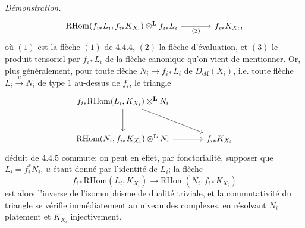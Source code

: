\documentclass[11pt]{article}
\newenvironment{prooftext}[1][Proof]{\par\noindent\emph{#1.}\ }{\par\medskip}
\providecommand{\RHom}{\mathrm{RHom}}
\providecommand{\Dctf}{D_{\mathrm{ctf}}}
\providecommand{\Dctf}{D_{\mathrm{ctf}}}
\providecommand{\RHom}{\mathrm{RHom}}
\providecommand{\RHom}{\mathrm R\mathcal{H}om}
\providecommand{\RHom}{\mathrm{RHom}}
\begin{document}
\begin{prooftext}[Démonstration]
\begin{equation}
\begin{tikzcd}[column sep=large,row sep=large]
\RHom(f_{i*}L_i,f_{i*}K_{X_i})\otimes^{\mathbf L} f_{i*}L_i
 \arrow[r,"(2)"'] &
f_{i*}K_{X_i},
\end{tikzcd}
\end{equation}
où $(1)$ est la flèche $(1)$ de 4.4.4, $(2)$ la flèche d'évaluation, et $(3)$ le produit tensoriel par $f_{i*}L_i$ de la flèche canonique qu'on vient de mentionner. Or, plus généralement, pour toute flèche $N_i\longrightarrow f_{i*}L_i$ de $\Dctf(X_i)$, i.e. toute flèche $L_i\xrightarrow{u}N_i$ de type $1$ au-dessus de $f_i$, le triangle
\[
\begin{tikzcd}[column sep=large,row sep=large]
f_{i*}\RHom(L_i,K_{X_i})\otimes^{\mathbf L}N_i
 \arrow[dr] \arrow[d] & \\
\RHom(N_i,f_{i*}K_{X_i})\otimes^{\mathbf L}N_i \arrow[r] &
f_{i*}K_{X_i}
\end{tikzcd}
\]
déduit de 4.4.5 commute: on peut en effet, par fonctorialité, supposer que $L_i=f_i^*N_i$, $u$ étant donné par l'identité de $L_i$; la flèche
\[
f_{i*}\RHom(L_i,K_{X_i})\longrightarrow\RHom(N_i,f_{i*}K_{X_i})
\]
est alors l'inverse de l'isomorphisme de dualité triviale, et la commutativité du triangle se vérifie immédiatement au niveau des complexes, en résolvant $N_i$ platement et $K_{X_i}$ injectivement.


\end{prooftext}
\end{document}
